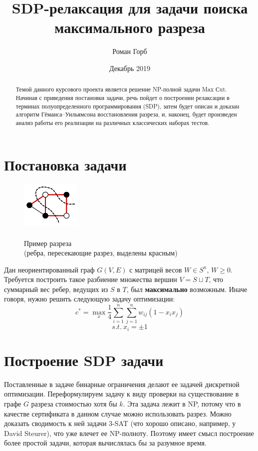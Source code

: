 \documentclass[12pt, a4paper]{article}
\title{SDP-релаксация для задачи поиска максимального разреза}
\author{Роман Горб}
\date{Декабрь 2019}
\begin{document}
\maketitle

\begin{abstract}
Темой данного курсового проекта является решение NP-полной задачи Max Сut. Начиная с приведения постановки задачи, речь пойдет о построении релаксации в терминах полуопределенного программирования (SDP), затем будет описан и доказан алгоритм Гёманса–Уильямсона восстановления разреза, и, наконец, будет произведен анализ работы его реализации на различных классических наборах тестов.
\end{abstract}

\tableofcontents

\newpage

\section{Постановка задачи}

\begin{figure}
    \centering
    \includegraphics[width=0.25\textwidth]{images/Max-cut.png}
    \caption{\\Пример разреза\\(ребра, пересекающие разрез, выделены красным)}
    \label{fig:fig1}
\end{figure}

Дан неориентированный граф $G(V, E)$ с матрицей весов $W \in S^n$, $W \geqslant 0$. Требуется построить такое разбиение множества вершин $V=S\sqcup T$, что суммарный вес ребер, ведущих из $S$ в $T$, был \textbf{максимально} возможным. Иначе говоря, нужно решить следующую задачу оптимизации:
$$c^* = \max \limits_{x} \frac{1}{4} \sum_{i = 1}^{n} \sum_{j = 1}^{n} w_{ij}(1 - x_i x_j)$$
$$s.t.\: x_i =\pm1$$

\section{Построение SDP задачи}
Поставленные в задаче бинарные ограничения делают ее задачей дискретной оптимизации. Переформулируем задачу к виду проверки на существование в графе $G$ разреза стоимостью хотя бы $k$. Эта задача лежит в NP, потому что в качестве сертификата в данном случае можно использовать разрез. Можно доказать сводимость к ней задачи 3-SAT (что хорошо описано, например, у David Steurer\cite{reduction}), что уже влечет ее NP-полноту. Поэтому имеет смысл построение более простой задачи, которая вычислялась бы за разумное время.
\end{document}
